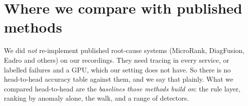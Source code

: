\section{Where we compare with published methods}
\begin{simplebox}
We did \emph{not} re-implement published root-cause systems (MicroRank, DiagFusion, Eadro and others) on our recordings. They need tracing in every service, or labelled failures and a GPU, which our setting does not have. So there is no head-to-head accuracy table against them, and we say that plainly. What we compared head-to-head are the \emph{baselines those methods build on}: the rule layer, ranking by anomaly alone, the walk, and a range of detectors.
\end{simplebox}
